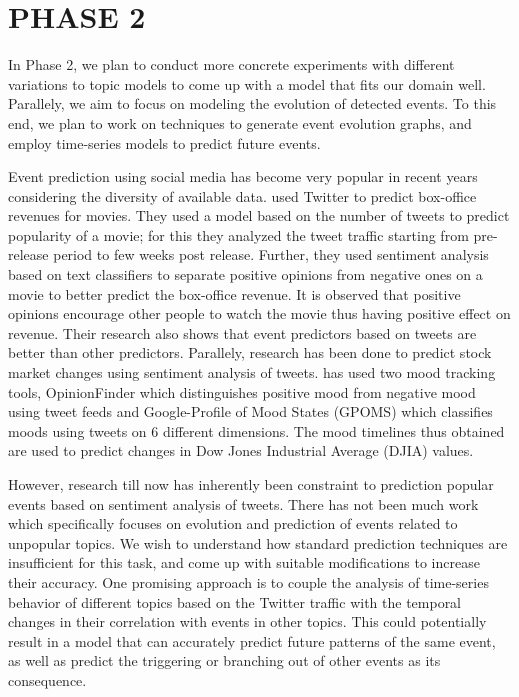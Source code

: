 \section{\uppercase{Phase 2}}
In Phase 2, we plan to conduct more concrete experiments with different variations to topic models to come up with a model that fits our domain well. Parallely, we aim to focus on modeling the evolution of detected events. To this end, we plan to work on techniques to generate event evolution graphs, and employ time-series models to predict future events. 

Event prediction using social media has become very popular in recent years considering the diversity of available data. \cite{asur2010predicting} used Twitter to predict box-office revenues for movies. They used a model based on the number of tweets to predict popularity of a movie; for this they analyzed the tweet traffic starting from pre-release period to few weeks post release. Further, they used sentiment analysis based on text classifiers to separate positive opinions from negative ones on a movie to better predict the box-office revenue. It is observed that positive opinions encourage other people to watch the movie thus having positive effect on revenue. Their research also shows that event predictors based on tweets are better than other predictors. Parallely, research has been done to predict stock market changes using sentiment analysis of tweets. \cite{bollen2011twitter} has used two mood tracking tools, OpinionFinder which distinguishes positive mood from negative mood using tweet feeds and Google-Profile of Mood States (GPOMS) which classifies moods using tweets on 6 different dimensions. The mood timelines thus obtained are used to predict changes in Dow Jones Industrial Average (DJIA) values.

However, research till now has inherently been constraint to prediction popular events based on sentiment analysis of tweets. There has not been much work which specifically focuses on evolution and prediction of events related to unpopular topics. We wish to understand how standard prediction techniques are insufficient for this task, and come up with suitable modifications to increase their accuracy. One promising approach is to couple the analysis of time-series behavior of different topics based on the Twitter traffic with the temporal changes in their correlation with events in other topics. This could potentially result in a model that can accurately predict future patterns of the same event, as well as predict the triggering or branching out of other events as its consequence.